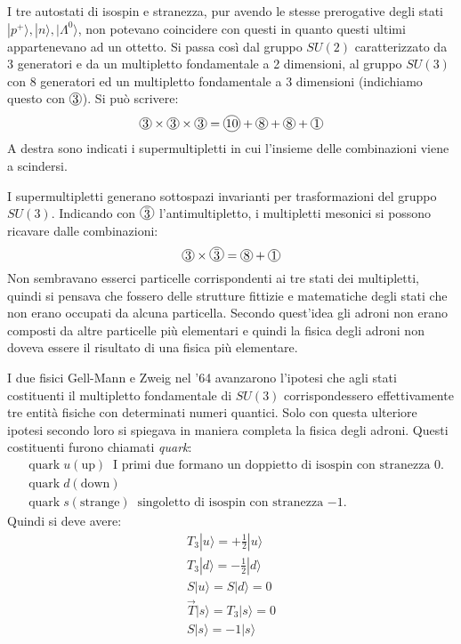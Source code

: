 I tre autostati di isospin e stranezza, pur avendo le stesse prerogative degli stati
$|p^+\rangle,|n\rangle,|\Lambda^0\rangle$, non potevano coincidere con questi in
quanto questi ultimi appartenevano
ad un ottetto.
Si passa così dal gruppo $SU(2)$ caratterizzato da 3 generatori e da un
multipletto fondamentale a 2 dimensioni, al
gruppo $SU(3)$ con 8 generatori ed un multipletto fondamentale a 3 dimensioni
(indichiamo questo con $\Ci{3}$). Si può scrivere:
\begin{equation}
\Ci{3}\times\Ci{3}\times\Ci{3}=\Ci{10}+\Ci{8}+\Ci{8}+\Ci{1}
\end{equation}
A destra sono indicati i supermultipletti in cui l'insieme delle combinazioni
viene a scindersi.

I supermultipletti generano sottospazi invarianti per trasformazioni del gruppo
$SU(3)$. Indicando con $\Ci{$\bar{3}$}$ l'antimultipletto, i multipletti mesonici
si possono ricavare dalle combinazioni:
\[
\Ci{3}\times\Ci{$\bar{3}$}=\Ci{8}+\Ci{1}
\]
Non sembravano esserci particelle corrispondenti ai tre stati dei multipletti,
quindi si pensava che fossero delle strutture fittizie e matematiche degli stati
che non erano occupati da alcuna particella.
Secondo quest'idea gli adroni non erano composti da altre particelle più
elementari e quindi la fisica degli adroni non doveva essere il risultato di una
fisica più elementare.

I due fisici Gell-Mann e Zweig nel '64 avanzarono l'ipotesi che agli stati costituenti il multipletto fondamentale
di $SU(3)$ corrispondessero effettivamente tre entità fisiche con determinati numeri quantici.
Solo con questa ulteriore ipotesi secondo loro si spiegava in maniera completa la fisica degli adroni. Questi
costituenti furono chiamati \textit{quark}:
\begin{equation}
\begin{split}
&\text{quark}\;u (\text{up})\;\;\text{I primi due formano un doppietto di isospin con stranezza $0$.}\\
&\text{quark}\;d (\text{down})\\
&\text{quark}\;s (\text{strange})\;\;\text{singoletto di isospin con stranezza $-1$.}
\end{split}
\end{equation}
Quindi si deve avere:
\begin{gather}
T_3|u\rangle=+\frac{1}{2}|u\rangle\\
T_3|d\rangle=-\frac{1}{2}|d\rangle\\
S|u\rangle=S|d\rangle=0\\
\vec{T}|s\rangle=T_3|s\rangle=0\\
S|s\rangle=-1|s\rangle
\end{gather}

